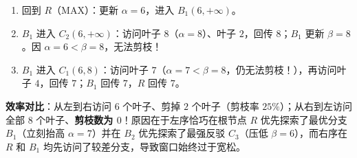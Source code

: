 \begin{enumerate}[label=(\arabic*), leftmargin=1.8em]
\begin{enumerate}[label=\roman*., leftmargin=1.6em]
    \item 回到 $R$（\textsf{MAX}）：更新 $\alpha = 6$，进入 $B_1(6, +\infty)$。
    \item $B_1$ 进入 $C_2(6, +\infty)$：访问叶子 $8$（$\alpha=8$）、叶子 $2$，回传 $8$；$B_1$ 更新 $\beta=8$。因 $\alpha=6 < \beta=8$，无法剪枝！
    \item $B_1$ 进入 $C_1(6, 8)$：访问叶子 $7$（$\alpha=7 < \beta=8$，仍无法剪枝！），再访问叶子 $4$，回传 $7$；$B_1$ 回传 $7$，$R$ 回传 $7$。
  \end{enumerate}
  \textbf{效率对比}：从左到右访问 $6$ 个叶子、剪掉 $2$ 个叶子（剪枝率 $25\%$）；从右到左访问全部 $8$ 个叶子、\textbf{剪枝数为 $0$}！原因在于左序恰巧在根节点 $R$ 优先探索了最优分支 $B_1$（立刻抬高 $\alpha=7$）并在 $B_2$ 优先探索了最强反驳 $C_3$（压低 $\beta=6$），而右序在 $R$ 和 $B_1$ 均先访问了较差分支，导致窗口始终过于宽松。
\end{enumerate}

